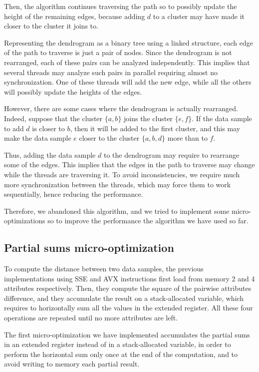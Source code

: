 \documentclass{article}
\begin{document}
Then, the algorithm continues traversing the path so to possibly update the height of the
remaining edges, because adding $d$ to a cluster may have made it closer to the cluster it
joins to.

Representing the dendrogram as a binary tree using a linked structure, each edge of the path to
traverse is just a pair of nodes.
Since the dendrogram is not rearranged, each of these pairs can be analyzed independently.
This implies that several threads may analyze such pairs in parallel requiring almost no
synchronization. One of these threads will add the new edge, while all the others will possibly
update the heights of the edges.

However, there are some cases where the dendrogram is actually rearranged. Indeed, suppose that
the cluster $\{a, b\}$ joins the cluster $\{e, f\}$. If the data sample
to add $d$ is closer to $b$, then it will be added to the first cluster, and this may make the
data sample $e$ closer to the cluster $\{a, b, d\}$ more than to $f$.

Thus, adding the data sample $d$ to the dendrogram may require to rearrange some of the edges.
This implies that the edges in the path to traverse may change while the threads are traversing it.
To avoid inconsistencies, we require much more synchronization between the threads, which may force
them to work sequentially, hence reducing the performance.

Therefore, we abandoned this algorithm, and we tried to implement some micro-optimizations so to
improve the performance the algorithm we have used so far.

\hypertarget{micro-optimization-partial-sum}{%
\subsection{Partial sums micro-optimization}\label{micro-optimization-partial-sum}}

To compute the distance between two data samples, the previous implementations using SSE and AVX
instructions first load from memory 2 and 4 attributes respectively. Then, they compute the
square of the pairwise attributes difference, and they accumulate the result on a stack-allocated
variable, which requires to horizontally sum all the values in the extended register.
All these four operations are repeated until no more attributes are left.

The first micro-optimization we have implemented accumulates the partial sums in an
extended register instead of in a
stack-allocated variable, in order to perform the horizontal sum only once at the end of the
computation, and to avoid writing to memory each partial result.
\end{document}
